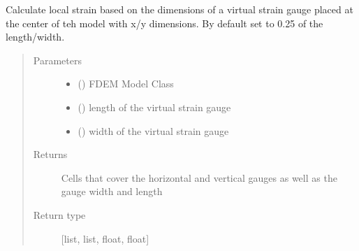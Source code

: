 \documentclass[letterpaper,10pt,english]{sphinxmanual}
\begin{document}

\begin{fulllineitems}
\label{\detokenize{openfdem:openfdem.complete_BD_thread_pool_generators.set_strain_gauge}}
Calculate local strain based on the dimensions of a virtual strain gauge placed at the center of teh model with
x/y dimensions. By default set to 0.25 of the length/width.
\begin{quote}\begin{description}
\item[{Parameters}] \leavevmode\begin{itemize}
\item {} 
 ({\hyperref[\detokenize{openfdem:openfdem.openfdem.Model}]{}}) \textendash{} FDEM Model Class

\item {} 
 () \textendash{} length of the virtual strain gauge

\item {} 
 () \textendash{} width of the virtual strain gauge

\end{itemize}

\item[{Returns}] \leavevmode
Cells that cover the horizontal and vertical gauges as well as the gauge width and length

\item[{Return type}] \leavevmode
{[}list, list, float, float{]}

\end{description}\end{quote}

\end{fulllineitems}
\end{document}
